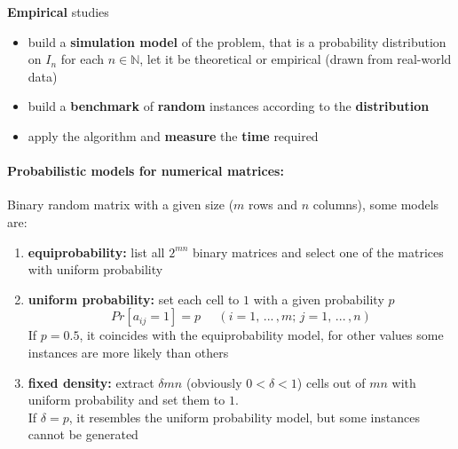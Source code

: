 \documentclass[11pt]{article}
\begin{document}
	\textbf{Empirical} studies
	\begin{itemize}
		\item build a \textbf{simulation model} of the problem, that is a probability distribution on $I_n$ for each $n \in \mathbb{N}$, let it be theoretical or empirical (drawn from real-world data) 
		\item build a \textbf{benchmark} of \textbf{random} instances according to the \textbf{distribution}
		\item apply the algorithm and \textbf{measure} the \textbf{time} required
	\end{itemize}
	
	\paragraph{Probabilistic models for numerical matrices:} Binary random matrix with a given size ($m$ rows and $n$ columns), some models are: 
	\begin{enumerate}
		\item \textbf{equiprobability:} list all $2^{mn}$ binary matrices and select one of the matrices with uniform probability
		\item \textbf{uniform probability:} set each cell to $1$ with a given probability $p$
		$$ Pr[a_{ij} = 1] = p \;\;\;\;\; (i = 1, \, ... \, , m; \, j = 1, \, ... \, , n) $$
		If $p = 0.5$, it coincides with the equiprobability model, for other values some instances are more likely than others
		\item \textbf{fixed density:} extract $\delta mn$ (obviously $0 < \delta < 1$) cells out of $mn$ with uniform probability and set them to $1$.\\
		If $\delta = p$, it resembles the uniform probability model, but some instances cannot be generated
	\end{enumerate}
	
	\newpage
	
\end{document}
